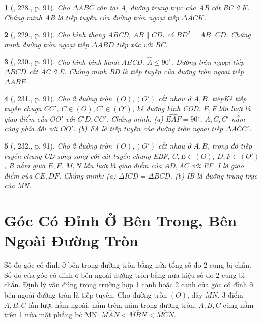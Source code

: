 \documentclass{article}
\newtheorem{baitoan}{}
\begin{document}
\begin{baitoan}[\cite{Binh_Toan_9_tap_2}, 228., p. 91]
	Cho $\Delta ABC$ cân tại A, đường trung trực của AB cắt BC ở K. Chứng minh AB là tiếp tuyến của đường tròn ngoại tiếp $\Delta ACK$.
\end{baitoan}

\begin{baitoan}[\cite{Binh_Toan_9_tap_2}, 229., p. 91]
	Cho hình thang ABCD, $AB\parallel CD$, có $BD^2 = AB\cdot CD$. Chứng minh đường tròn ngoại tiếp $\Delta ABD$ tiếp xúc với BC.
\end{baitoan}

\begin{baitoan}[\cite{Binh_Toan_9_tap_2}, 230., p. 91]
	Cho hình bình hành ABCD, $\widehat{A}\le90^\circ$. Đường tròn ngoại tiếp $\Delta BCD$ cắt AC ở E. Chứng minh BD là tiếp tuyến của đường tròn ngoại tiếp $\Delta ABE$.
\end{baitoan}

\begin{baitoan}[\cite{Binh_Toan_9_tap_2}, 231., p. 91]
	Cho 2 đường tròn $(O),(O')$ cắt nhau ở $A,B$. tiêpKẻ tiếp tuyến chugn $CC'$, $C\in(O),C'\in(O')$, kẻ đường kính COD. $E,F$ lần lượt là giao điểm của $OO'$ với $C'D,CC'$. Chứng minh: (a) $\widehat{EAF} = 90^\circ$, $A,C,C'$ nằm cùng phía đối với $OO'$. (b) FA là tiếp tuyến của đường tròn ngoại tiếp $\Delta ACC'$.
\end{baitoan}

\begin{baitoan}[\cite{Binh_Toan_9_tap_2}, 232., p. 91]
	Cho 2 đường tròn $(O),(O')$ cắt nhau ở $A,B$, trong đó tiếp tuyến chung CD song song với cát tuyến chung EBF, $C,E\in(O)$, $D,F\in(O')$, B nằm giữa $E,F$. $M,N$ lần lượt là giao điểm của $AD,AC$ với EF. I là giao điểm của $CE,DF$. Chứng minh: (a) $\Delta ICD = \Delta BCD$. (b) IB là đường trung trực của MN.
\end{baitoan}


\section{Góc Có Đỉnh Ở Bên Trong, Bên Ngoài Đường Tròn}
 Số đo góc có đỉnh ở bên trong đường tròn bằng nửa tổng số đo 2 cung bị chắn.  Số đo của góc có đỉnh ở bên ngoài đường tròn bằng nửa hiệu số đo 2 cung bị chắn. Định lý vẫn đúng trong trường hợp 1 cạnh hoặc 2 cạnh của góc có đỉnh ở bên ngoài đường tròn là tiếp tuyến. Cho đường tròn $(O)$, dây $MN$. 3 điểm $A,B,C$ lần lượt nằm ngoài, nằm trên, nằm trong đường tròn, $A,B,C$ cùng nằm trên 1 nửa mặt phẳng bờ MN: $\widehat{MAN} < \widehat{MBN} < \widehat{MCN}$.
\end{document}
